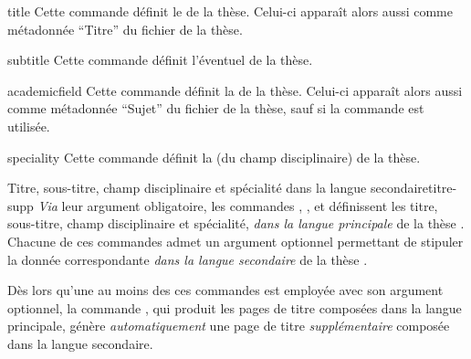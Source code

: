 %
\begin{docCommand}[doc description=\mandatory]{title}{}%
  Cette commande définit le  de la thèse. Celui-ci apparaît alors
  aussi comme métadonnée \enquote{Titre} du fichier \pdf{} de la thèse.
\end{docCommand}
%
\begin{docCommand}{subtitle}{}%
  Cette commande définit l'éventuel  de la thèse.
\end{docCommand}
%
\begin{docCommand}[doc description=\mandatory]{academicfield}{}%
  Cette commande définit la  
  de la thèse. Celui-ci apparaît alors aussi comme métadonnée \enquote{Sujet} du
  fichier \pdf{} de la thèse, sauf si la commande  est utilisée.
\end{docCommand}
%
\begin{docCommand}{speciality}{}%
  Cette commande définit la  (du champ
  disciplinaire) de la thèse.
\end{docCommand}
%
\begin{dbremark}{Titre, sous-titre, champ disciplinaire et spécialité dans la
    langue secondaire}{titre-supp}%
  \emph{Via} leur argument obligatoire, les commandes ,
  ,  et  définissent
  les titre, sous-titre, champ disciplinaire et spécialité, \emph{dans la
    langue principale} de la thèse . Chacune de
  ces commandes admet un argument optionnel permettant de stipuler la donnée
  correspondante \emph{dans la langue secondaire} de la thèse .

  Dès lors qu'une au moins des ces commandes est employée avec son argument
  optionnel, la commande , qui produit les pages de titre
  composées dans la langue principale, génère \emph{automatiquement} une page
  de titre \emph{supplémentaire} composée dans la langue secondaire.
\end{dbremark}
